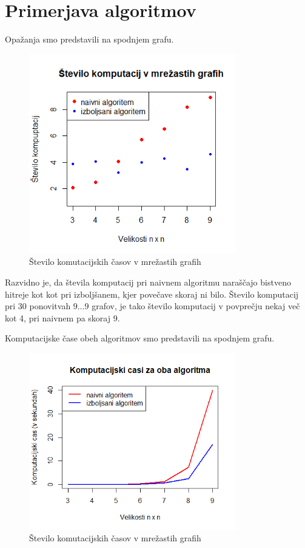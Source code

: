 \documentclass[a4paper, 12 pt]{article}
\theoremstyle{definition} %
\theoremstyle{plain} %
\theoremstyle{definition}
\begin{document}
\section{Primerjava algoritmov}

Opažanja smo predstavili na spodnjem grafu. 

\begin{figure}[H]
  \centering
  \includegraphics[width=90mm]{Rplot2.png}
  \caption{Število komutacijskih časov v mrežastih grafih}
  \label{fig: Graf 1}
\end{figure}

Razvidno je, da števila komputacij pri naivnem algoritmu naraščajo bistveno hitreje kot kot pri izboljšanem, kjer povečave skoraj ni bilo. Število komputacij pri 30 ponovitvah $9 \dots 9$ grafov, je tako število komputacij v povprečju nekaj več kot 4, pri naivnem pa skoraj 9.\newline

Komputacijske čase obeh algoritmov smo predstavili na spodnjem grafu.

\begin{figure}[H]
  \centering
  \includegraphics[width=90mm]{Rplot3.png}
  \caption{Število komutacijskih časov v mrežastih grafih}
  \label{fig: Graf 1}
\end{figure}
\end{document}
